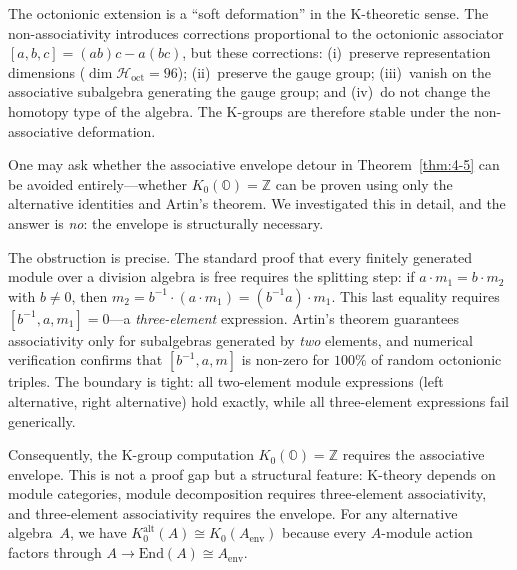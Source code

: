 \begin{remark}
The octonionic extension is a ``soft deformation'' in the K-theoretic sense. The non-associativity introduces corrections proportional to the octonionic associator $[a, b, c] = (ab)c - a(bc)$, but these corrections: (i)~preserve representation dimensions ($\dim \mathcal{H}_{\mathrm{oct}} = 96$); (ii)~preserve the gauge group; (iii)~vanish on the associative subalgebra generating the gauge group; and (iv)~do not change the homotopy type of the algebra. The K-groups are therefore stable under the non-associative deformation.
\end{remark}

\begin{remark}\label{rem:4-envelope-necessity}
One may ask whether the associative envelope detour in Theorem~\ref{thm:4-5} can be avoided entirely---whether $K_0(\mathbb{O}) = \mathbb{Z}$ can be proven using only the alternative identities and Artin's theorem. We investigated this in detail, and the answer is \emph{no}: the envelope is structurally necessary.

The obstruction is precise. The standard proof that every finitely generated module over a division algebra is free requires the splitting step: if $a \cdot m_1 = b \cdot m_2$ with $b \neq 0$, then $m_2 = b^{-1} \cdot (a \cdot m_1) = (b^{-1} a) \cdot m_1$. This last equality requires $[b^{-1}, a, m_1] = 0$---a \emph{three-element} expression. Artin's theorem guarantees associativity only for subalgebras generated by \emph{two} elements, and numerical verification confirms that $[b^{-1}, a, m]$ is non-zero for $100\%$ of random octonionic triples. The boundary is tight: all two-element module expressions (left alternative, right alternative) hold exactly, while all three-element expressions fail generically.

Consequently, the K-group computation $K_0(\mathbb{O}) = \mathbb{Z}$ requires the associative envelope. This is not a proof gap but a structural feature: K-theory depends on module categories, module decomposition requires three-element associativity, and three-element associativity requires the envelope. For any alternative algebra~$A$, we have $K_0^{\mathrm{alt}}(A) \cong K_0(A_{\mathrm{env}})$ because every $A$-module action factors through $A \to \mathrm{End}(A) \cong A_{\mathrm{env}}$.
\end{remark}

